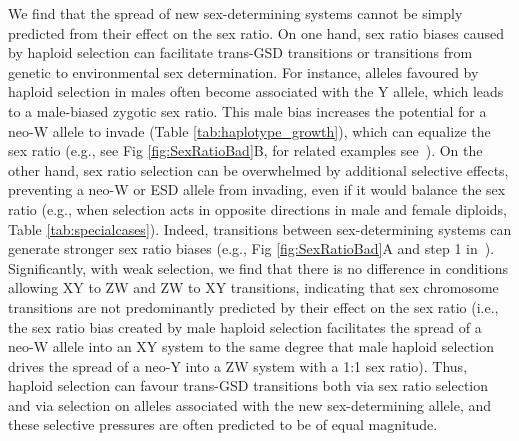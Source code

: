 \documentclass[10pt,letterpaper]{article}
\begin{document}
We find that the spread of new sex-determining systems cannot be simply predicted from their effect on the sex ratio. 
On one hand, sex ratio biases caused by haploid selection can facilitate trans-GSD transitions or transitions from genetic to environmental sex determination. 
For instance, alleles favoured by haploid selection in males often become associated with the Y allele, which leads to a male-biased zygotic sex ratio.
This male bias increases the potential for a neo-W allele to invade (Table \ref{tab:haplotype_growth}), which can equalize the sex ratio (e.g., see Fig \ref{fig:SexRatioBad}B, for related examples see~\cite{Kozielska:2010vm}).
On the other hand, sex ratio selection can be overwhelmed by additional selective effects, preventing a neo-W or ESD allele from invading, even if it would balance the sex ratio (e.g., when selection acts in opposite directions in male and female diploids, Table \ref{tab:specialcases}). %
Indeed, transitions between sex-determining systems can generate stronger sex ratio biases (e.g., Fig \ref{fig:SexRatioBad}A and step 1 in~\cite{Ubeda:2015fx}).
Significantly, with weak selection, we find that there is no difference in conditions allowing XY to ZW and ZW to XY transitions, indicating that sex chromosome transitions are not predominantly predicted by their effect on the sex ratio (i.e., the sex ratio bias created by male haploid selection facilitates the spread of a neo-W allele into an XY system to the same degree that male haploid selection drives the spread of a neo-Y into a ZW system with a 1:1 sex ratio). 
Thus, haploid selection can favour trans-GSD transitions both via sex ratio selection and via selection on alleles associated with the new sex-determining allele, and these selective pressures are often predicted to be of equal magnitude. 
\end{document}
